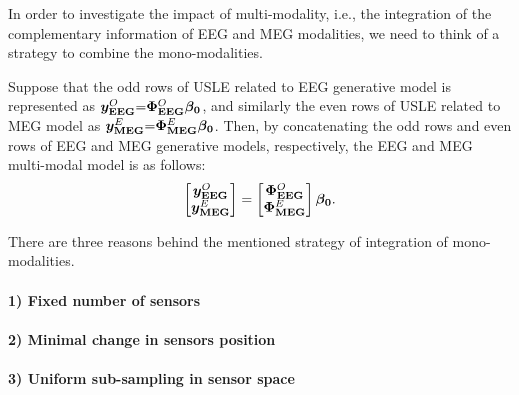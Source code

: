 In order to investigate the impact of multi-modality, i.e., the integration of the complementary information of EEG and MEG modalities, we need to think of a strategy to combine the mono-modalities.

Suppose that the odd rows of USLE related to EEG generative model is represented as $\boldsymbol{y}_{\boldsymbol{\mathrm{EEG}}}^{O} {=} \boldsymbol{\Phi}_{\boldsymbol{\mathrm{EEG}}}^{O} \boldsymbol{\beta_0}$, and similarly the even rows of USLE related to MEG model as $\boldsymbol{y}_{\boldsymbol{\mathrm{MEG}}}^{E} {=} \boldsymbol{\Phi}_{\boldsymbol{\mathrm{MEG}}}^{E} \boldsymbol{\beta_0}$.
Then, by concatenating the odd rows and even rows of EEG and MEG generative models, respectively, the EEG and MEG multi-modal model is as follows:
\begin{equation}
\label{eq:multimodal-model} 
\begin{bmatrix}
\boldsymbol{y}_{\boldsymbol{\mathrm{EEG}}}^{O} \\
\boldsymbol{y}_{\boldsymbol{\mathrm{MEG}}}^{E}
\end{bmatrix} 
=
\begin{bmatrix}
\boldsymbol{\Phi}_{\boldsymbol{\mathrm{EEG}}}^{O} \\
\boldsymbol{\Phi}_{\boldsymbol{\mathrm{MEG}}}^{E}
\end{bmatrix}
\boldsymbol{\beta_0}.
\end{equation}

There are three reasons behind the mentioned strategy of integration of mono-modalities.
\paragraph{1) Fixed number of sensors}

\paragraph{2) Minimal change in sensors position}

\paragraph{3) Uniform sub-sampling in sensor space}
